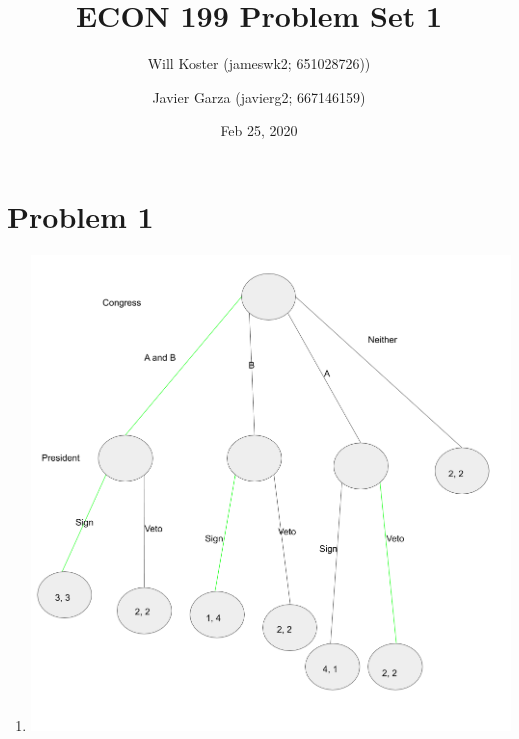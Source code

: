 \documentclass[letterpaper]{article}
\begin{document}
\title{ECON 199 Problem Set 1}
\author{Will Koster (jameswk2; 651028726)) \and Javier Garza (javierg2; 667146159)}
\date{Feb 25, 2020}
\maketitle

\clearpage

\section{Problem 1}
\begin{enumerate}
    \item \includegraphics[scale=0.4]{fig1}

\end{enumerate}
\end{document}
